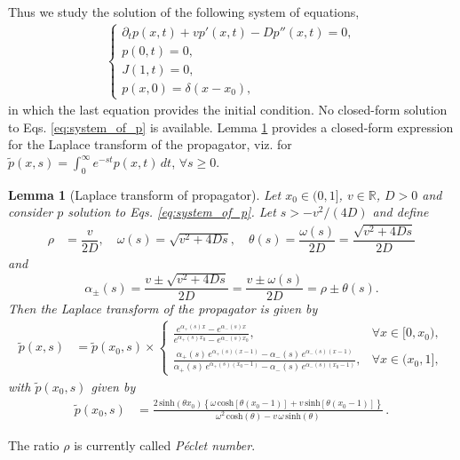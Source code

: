 \documentclass[preprint,12pt]{elsarticle}
\numberwithin{equation}{section}
\theoremstyle{plain} \newtheorem{theorem}{Theorem}[section]
\theoremstyle{plain} \newtheorem{proposition}[theorem]{Proposition}
\theoremstyle{plain} \newtheorem{lemma}[theorem]{Lemma}
\theoremstyle{plain} \newtheorem{corollary}[theorem]{Corollary}
\theoremstyle{definition} \newtheorem{definition}[theorem]{Definition}
\theoremstyle{definition} \newtheorem{notation}[theorem]{Notation}
\theoremstyle{remark} \newtheorem{remark}[theorem]{Remark}
\theoremstyle{remark} \newtheorem{remarks}[theorem]{Remarks}
\theoremstyle{remark} \newtheorem{algorithm2}[theorem]{Algorithm}
\theoremstyle{remark} \newtheorem{example}[theorem]{Example}
\begin{document}
Thus we study the solution of the following system of equations, 
\begin{align} \label{eq:system_of_p}
\left\{
				\begin{array}{ll}
					\partial_t{p}(x,t)+vp'(x,t)-Dp''(x,t)=0 , \\
    p(0,t) = 0, \\  J(1,t)=0, \\
    p(x,0) = \delta(x-x_0),
				\end{array}
				\right.
\end{align}
in which the last equation provides the initial condition.
No closed-form solution to Eqs. \eqref{eq:system_of_p} is available. Lemma \ref{lemma:propagator} 
provides a closed-form expression for
the Laplace transform of the propagator, viz. for
$\tilde{p}(x,s)
	=\int_0^\infty e^{-st}p(x,t) \,dt$, $\forall s\geq 0$.
\begin{lemma}[Laplace transform of propagator]
\label{lemma:propagator}
Let $x_0 \in (0,1]$, $v \in \mathbb R$, $D>0$ and 
consider $p$ solution to Eqs. \eqref{eq:system_of_p}.
Let $s> - v^2/(4D)$ and define 
\begin{align}                           \label{eq:constants}
\rho & = \dfrac{v}{2D},
\quad \omega(s)=\sqrt{v^2+4 D s}, \quad
\theta(s)=\dfrac{\omega(s)}{2D}=\dfrac{\sqrt{v^2+4 D s}}{2D}
\end{align}
and
\begin{equation} \label{eq:roots}
	\alpha_\pm(s)
	=\frac{v\pm\sqrt{v^2+4Ds}}{2D}
	=\frac{v\pm\omega(s)}{2D}
    =\rho\pm\theta(s).
\end{equation}
Then the Laplace transform of the propagator 
is given by
\begin{align}\label{eq:p_below}
	\tilde{p}(x,s) & = \tilde{p}(x_0,s) \times
     \begin{cases}
	\frac{e^{\alpha_+(s) x}-e^{\alpha_-(s) x}}
	{e^{\alpha_+(s) x_0}-e^{\alpha_-(s) x_0}}, &
	\forall x\in[0,x_0),   \\
	\frac{\alpha_+(s) \, e^{\alpha_+(s) (x-1)} - \alpha_-(s) \, e^{\alpha_-(s) (x-1)}}
	{\alpha_+(s) \, e^{\alpha_+(s) (x_0-1)} - \alpha_-(s) \, e^{\alpha_-(s) (x_0-1)}}, & \forall x\in(x_0,1],  
\end{cases}
\end{align}
with $\tilde{p}(x_0, s)$ given by
\begin{align} \label{eq:px_0}
	\tilde{p}(x_0, s)
	&=\frac{2 \, \mathrm{sinh}(\theta x_0)\left\{\omega\,\mathrm{cosh}[\theta(x_0-1)]+v\,\mathrm{sinh}[\theta(x_0-1)]\right\}}{\omega^2 \,\mathrm{cosh}(\theta)-v\,\omega\,\mathrm{sinh}(\theta)}\, . 
\end{align}
\end{lemma}
The ratio $\rho$ is currently called {\it P\'eclet number}.
\end{document}
